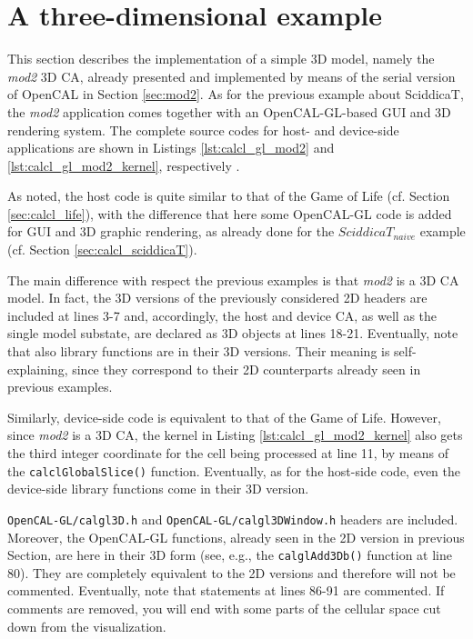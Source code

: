 \section{A three-dimensional example}

This section describes the implementation of a simple 3D model, namely
the \emph{mod2} 3D CA, already presented and implemented by means of
the serial version of OpenCAL in Section \ref{sec:mod2}. As for the
previous example about SciddicaT, the \emph{mod2} application comes
together with an OpenCAL-GL-based GUI and 3D rendering system. The
complete source codes for host- and device-side applications are shown
in Listings \ref{lst:calcl_gl_mod2} and
\ref{lst:calcl_gl_mod2_kernel}, respectively .







As noted, the host code is quite similar to that of the Game of Life (cf. Section
\ref{sec:calcl_life}), with the difference that here some OpenCAL-GL
code is added for GUI and 3D graphic rendering, as already done for
the $SciddicaT_{naive}$ example (cf. Section
\ref{sec:calcl_sciddicaT}).

The main difference with respect the previous examples is that
\emph{mod2} is a 3D CA model. In fact, the 3D versions of the
previously considered 2D headers are included at lines 3-7 and,
accordingly, the host and device CA, as well as the single model
substate, are declared as 3D objects at lines 18-21. Eventually, note
that also library functions are in their 3D versions. Their meaning is
self-explaining, since they correspond to their 2D counterparts already
seen in previous examples.

Similarly, device-side code is equivalent to that of the Game of
Life. However, since \emph{mod2} is a 3D CA, the kernel in Listing
\ref{lst:calcl_gl_mod2_kernel} also gets the third integer coordinate
for the cell being processed at line 11, by means of the
\verb'calclGlobalSlice()' function. Eventually, as for the host-side
code, even the device-side library functions come in their 3D version.

\verb'OpenCAL-GL/calgl3D.h' and \verb'OpenCAL-GL/calgl3DWindow.h'
headers are included. Moreover, the OpenCAL-GL functions, already seen
in the 2D version in previous Section, are here in their 3D form (see,
e.g., the \verb'calglAdd3Db()' function at line 80). They
are completely equivalent to the 2D versions and therefore will
not be commented. Eventually, note that statements at lines 86-91 are
commented. If comments are removed, you will end with some parts of
the cellular space cut down from the visualization.

